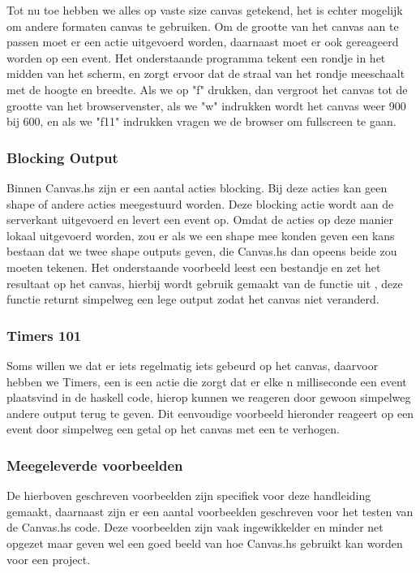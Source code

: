 Tot nu toe hebben we alles op vaste size canvas getekend, het is echter mogelijk om andere formaten canvas te gebruiken. Om de grootte van het canvas aan te passen moet er een  actie uitgevoerd worden, daarnaast moet er ook gereageerd worden op een  event. Het onderstaande programma tekent een rondje in het midden van het scherm, en zorgt ervoor dat de straal van het rondje meeschaalt met de hoogte en breedte. Als we op "f" drukken, dan vergroot het canvas tot de grootte van het browservenster, als we "w" indrukken wordt het canvas weer 900 bij 600, en als we "f11" indrukken vragen we de browser om fullscreen te gaan.



\subsubsection{Blocking Output}
Binnen Canvas.hs zijn er een aantal acties blocking. Bij deze acties kan geen shape of andere acties meegestuurd worden. Deze blocking actie wordt aan de serverkant uitgevoerd en levert een event op. Omdat de acties op deze manier lokaal uitgevoerd worden, zou er als we een shape mee konden geven een kans bestaan dat we twee shape outputs geven, die Canvas.hs dan opeens beide zou moeten tekenen. Het onderstaande voorbeeld leest een bestandje en zet het resultaat op het canvas, hierbij wordt gebruik gemaakt van de  functie uit , deze functie returnt simpelweg een lege output zodat het canvas niet veranderd.



\subsubsection{Timers 101}
Soms willen we dat er iets regelmatig iets gebeurd op het canvas, daarvoor hebben we Timers, een  is een actie die zorgt dat er elke n milliseconde een event plaatsvind in de haskell code, hierop kunnen we reageren door gewoon simpelweg andere output terug te geven. Dit eenvoudige voorbeeld hieronder reageert op een  event door simpelweg een getal op het canvas met een te verhogen.



\subsubsection{Meegeleverde voorbeelden}
De hierboven geschreven voorbeelden zijn specifiek voor deze handleiding gemaakt, daarnaast zijn er een aantal voorbeelden geschreven voor het testen van de Canvas.hs code. Deze voorbeelden zijn vaak ingewikkelder en minder net opgezet maar geven wel een goed beeld van hoe Canvas.hs gebruikt kan worden voor een project.

